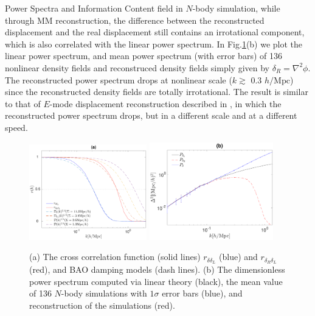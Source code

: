 \begin{section}{Power Spectra and Information Content}
field in $N$-body simulation, while through MM reconstruction, the difference between the reconstructed displacement 
and the real displacement still contains an irrotational component, which is also correlated with the linear power spectrum.
 In Fig.\ref{fig:cross-correlation-power}(b) we plot the linear power spectrum, and mean 
power spectrum (with error bars) of 136 nonlinear density fields and reconstruced density fields simply 
given by $\delta_R=\nabla^2\phi$. The reconstructed power spectrum drops at nonlinear scale ($k \gtrsim$ 0.3 $h/\mathrm{Mpc}$) 
since the reconstructed density fields are totally irrotational. The result is similar to that of 
$E$-mode displacement reconstruction described in \cite{bib:Yu2016}, in which the reconstructed power spectrum 
drops, but in a different scale and at a different speed.
\begin{figure}
\centering
\includegraphics[width=0.455\textwidth]{cross_correlation_best_analysis-crop.pdf} 
\includegraphics[width=0.48\textwidth]{power_best_analysis-crop.pdf}
\caption{(a) The cross correlation function (solid lines) $r_{\delta\delta_L}$ (blue) and $r_{\delta_R\delta_L}$ (red), 
and BAO damping models (dash lines). 
(b) The dimensionless power spectrum computed via linear theory (black), the mean value of 136 $N$-body simulations
with $1\sigma$ error bars (blue), and reconstruction of the simulations (red).}
\label{fig:cross-correlation-power}
\end{figure}


\end{section}
